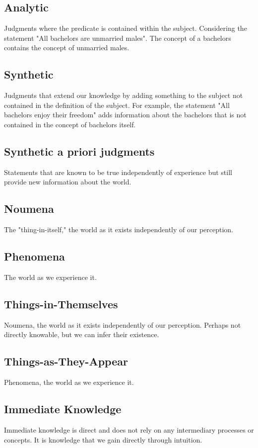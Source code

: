 \documentclass[a4paper]{article}
\begin{document}
\subsection{Analytic}
Judgments where the predicate is contained within the subject. 
Considering the statement "All bachelors are unmarried males".
The concept of a bachelors contains the concept of unmarried males. 

\subsection{Synthetic}
Judgments that extend our knowledge by adding something to the subject not contained in the definition of the subject.
For example, the statement "All bachelors enjoy their freedom" adds information about the bachelors that is not contained in the concept of bachelors itself.

\subsection{Synthetic a priori judgments}
Statements that are known to be true independently of experience but still provide new information about the world.

\subsection{Noumena}
The "thing-in-itself," the world as it exists independently of our perception.

\subsection{Phenomena}
The world as we experience it. 

\subsection{Things-in-Themselves}
Noumena, the world as it exists independently of our perception.
Perhaps not directly knowable, but we can infer their existence.

\subsection{Things-as-They-Appear}
Phenomena, the world as we experience it.

\subsection{Immediate Knowledge}
Immediate knowledge is direct and does not rely on any intermediary processes or concepts. It is knowledge that we gain directly through intuition.
\end{document}
